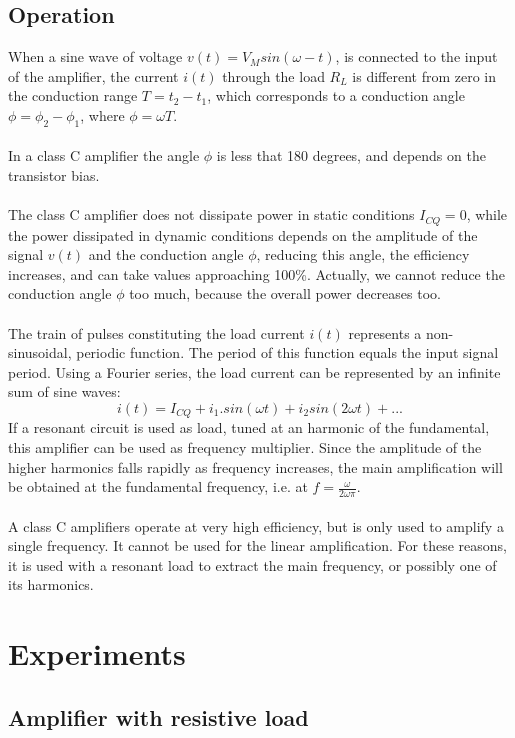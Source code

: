 \documentclass[12pt,a4paper]{report}
\begin{document}
\subsection{Operation}
When a sine wave of voltage $v(t) = V_M sin(\omega-t)$, is connected to the input of the amplifier, the current $i(t)$ through the load $R_L$ is different from zero in the conduction range $T = t_2 - t_1$, which corresponds to a conduction angle $\phi = \phi_2 - \phi_1$, where $\phi = \omega T$.
\\
\\
In a class C amplifier the angle $\phi$ is less that 180 degrees, and depends on the transistor bias.
\\
\\
The class C amplifier does not dissipate power in static conditions $I_{CQ} = 0$, while the power dissipated in dynamic conditions depends on the amplitude of the signal $v(t)$ and the conduction angle $\phi$, reducing this angle, the efficiency increases, and can take values approaching 100\%. Actually, we cannot reduce the conduction angle $\phi$ too much, because the overall power decreases too.
\\
\\
The train of pulses constituting the load current $i(t)$ represents a non-sinusoidal, periodic function. The period of this function equals the input signal period. Using a Fourier series, the load current can be represented by an infinite sum of sine waves:
$$i(t) = I_{CQ} + i_{1}.sin(\omega t) + i_{2}sin(2 \omega t) +...$$
If a resonant circuit is used as load, tuned at an harmonic of the fundamental, this amplifier can be used as frequency multiplier. Since the amplitude of the higher harmonics falls rapidly as frequency increases, the main amplification will be obtained at the fundamental frequency, i.e. at $f = \frac{\omega}{2 \omega \pi}$.
\\
\\
A class C amplifiers operate at very high efficiency, but is only used to amplify a single frequency. It cannot be used for the linear amplification. For these reasons, it is used with a resonant load to extract the main frequency, or possibly one of its harmonics.
\section{Experiments}
\subsection{Amplifier with resistive load}
\end{document}
